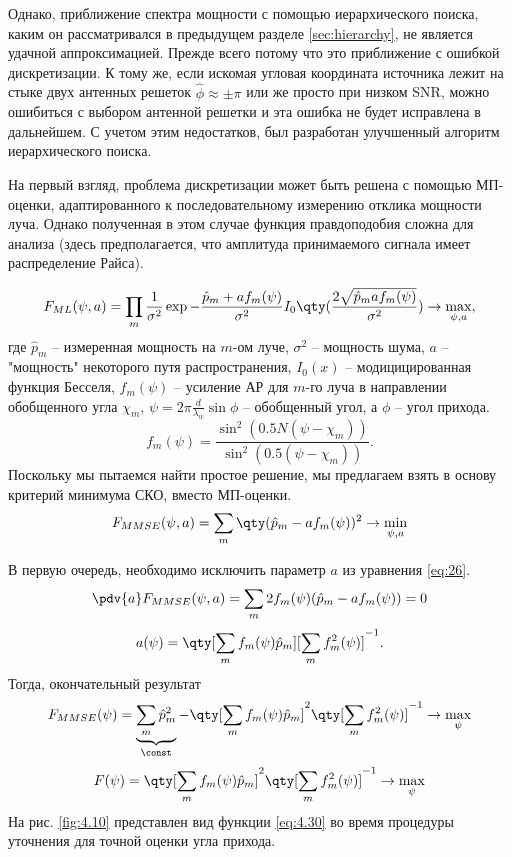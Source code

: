 Однако, приближение спектра мощности с помощью иерархического
поиска, каким он рассматривался в предыдущем разделе \eqref{sec:hierarchy}, не
является удачной аппроксимацией.  Прежде всего потому что это приближение с
ошибкой дискретизации. К тому же, если искомая угловая координата источника
лежит на стыке  двух антенных решеток $\hat \phi \approx \pm \pi$ или же просто
при низком SNR,  можно ошибиться с выбором антенной решетки и эта ошибка не
будет исправлена в дальнейшем. С учетом этим недостатков, был разработан
улучшенный алгоритм иерархического поиска.


На первый взгляд, проблема дискретизации может быть решена с помощью
МП-оценки, адаптированного к последовательному измерению отклика мощности
луча. Однако полученная в этом случае функция правдоподобия сложна для анализа
(здесь предполагается, что амплитуда принимаемого сигнала имеет распределение
Райса).

\begin{equation}
    F_{ML}(\psi, a) = \prod\limits_m \frac{1}{\sigma^2}
    \exp{-\frac{\hat p_m + a f_m(\psi)}{\sigma^2}
        I_0\qty(\frac{2\sqrt{\hat p_m a f_m(\psi)}}{\sigma^2})} \to \max_{\psi, a},
\end{equation}
где $\hat p_m$ -- измеренная мощность на $m$-ом луче, $\sigma^2$ -- мощность
шума, $a$ -- "мощность" некоторого путя распространения, $I_0(x)$ --
модицицированная функция Бесселя, $f_m(\psi)$ -- усиление АР для $m$-го луча в
направлении обобщенного угла $\chi_m$, $\psi = 2\pi \frac{d}{\lambda_w}\sin
    \phi$ -- обобщенный угол, а $\phi$ -- угол прихода.
\begin{equation}
    f_m(\psi) = \frac{\sin^2 (0.5N(\psi - \chi_m))}{\sin^2(0.5(\psi - \chi_m))}.
\end{equation}
Поскольку мы пытаемся найти простое решение, мы предлагаем взять в основу
критерий минимума СКО, вместо МП-оценки.
\begin{equation}
    \label{eq:26}
    F_{MMSE}(\psi, a) = \sum\limits_m \qty(\hat p_m - a f_m(\psi))^2 \to \min_{\psi,a}
\end{equation}

В первую очередь, необходимо исключить параметр $a$ из уравнения \eqref{eq:26}.
\begin{equation}
    \pdv{a} F_{MMSE}(\psi, a) = \sum\limits_m 2f_m(\psi) (\hat p_m - a f_m(\psi)) = 0
\end{equation}
\begin{equation}
    a(\psi) = \qty[\sum\limits_m f_m(\psi) \hat p_m][\sum\limits_m f_m^2(\psi)]^{-1}.
\end{equation}
Тогда, окончательный результат
\begin{equation}
    F_{MMSE}(\psi)=\underbrace{\sum\limits_m \hat p_m^2}_{\const} - \qty[\sum\limits_m f_m(\psi) \hat p_m]^2 \qty[\sum \limits_m f_m^2 (\psi)]^{-1} \to \max_{\psi}
\end{equation}
\begin{equation}
    \label{eq:4.30}
    F(\psi)=\qty[\sum\limits_m f_m(\psi) \hat p_m]^2 \qty[\sum \limits_m f_m^2 (\psi)]^{-1} \to \max_{\psi}
\end{equation}
На рис. \ref{fig:4.10} представлен вид функции \eqref{eq:4.30} во время процедуры уточнения для точной оценки угла прихода.

